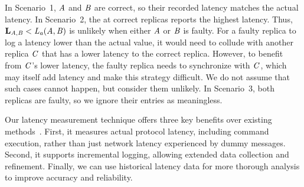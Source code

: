 \noindent
In Scenario~1, $\na$ and $\nb$ are correct, so their recorded latency matches the actual latency.
In Scenario~2, the \lm at correct replicas reports the highest latency.
Thus, $\lme{\na}{\nb} < \lat[a]{\na}{\nb}$ is unlikely when either $\na$ or $\nb$ is faulty.
For a faulty replica to log a latency lower than the actual value, it would need to collude with another replica $\nc$ that has a lower latency to the correct replica.
However, to benefit from $\nc$'s lower latency, the faulty replica needs to synchronize with $\nc$, which may itself add latency and make this strategy difficult.
We do not assume that such cases cannot happen, but consider them unlikely.
In Scenario~3, both replicas are faulty, so we ignore their \lm entries as meaningless.

Our latency measurement technique offers three key benefits over existing methods~\cite{aware,bft-smart,rbft}.
First, it measures actual protocol latency, including command execution, rather than just network latency experienced by dummy messages.
Second, it supports incremental logging, allowing extended data collection and refinement.
Finally, we can use historical latency data for more thorough analysis to improve accuracy and reliability.






